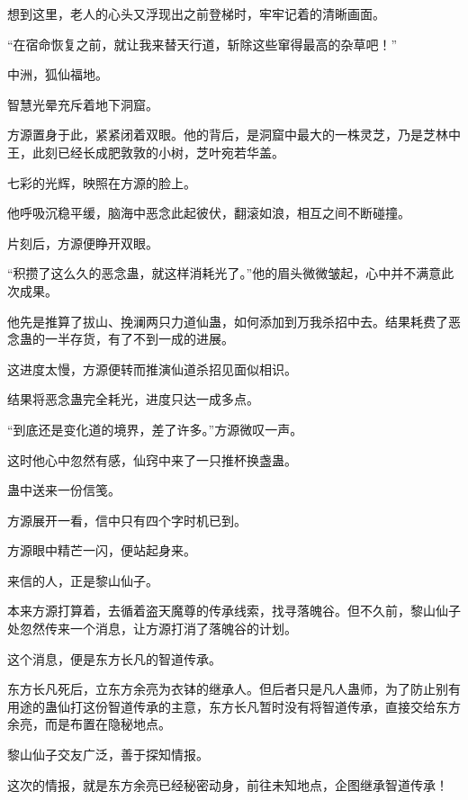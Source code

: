 \begin{this_body}
想到这里，老人的心头又浮现出之前登梯时，牢牢记着的清晰画面。

“在宿命恢复之前，就让我来替天行道，斩除这些窜得最高的杂草吧！”

中洲，狐仙福地。

智慧光晕充斥着地下洞窟。

方源置身于此，紧紧闭着双眼。他的背后，是洞窟中最大的一株灵芝，乃是芝林中王，此刻已经长成肥敦敦的小树，芝叶宛若华盖。

七彩的光辉，映照在方源的脸上。

他呼吸沉稳平缓，脑海中恶念此起彼伏，翻滚如浪，相互之间不断碰撞。

片刻后，方源便睁开双眼。

“积攒了这么久的恶念蛊，就这样消耗光了。”他的眉头微微皱起，心中并不满意此次成果。

他先是推算了拔山、挽澜两只力道仙蛊，如何添加到万我杀招中去。结果耗费了恶念蛊的一半存货，有了不到一成的进展。

这进度太慢，方源便转而推演仙道杀招见面似相识。

结果将恶念蛊完全耗光，进度只达一成多点。

“到底还是变化道的境界，差了许多。”方源微叹一声。

这时他心中忽然有感，仙窍中来了一只推杯换盏蛊。

蛊中送来一份信笺。

方源展开一看，信中只有四个字时机已到。

方源眼中精芒一闪，便站起身来。

来信的人，正是黎山仙子。

本来方源打算着，去循着盗天魔尊的传承线索，找寻落魄谷。但不久前，黎山仙子处忽然传来一个消息，让方源打消了落魄谷的计划。

这个消息，便是东方长凡的智道传承。

东方长凡死后，立东方余亮为衣钵的继承人。但后者只是凡人蛊师，为了防止别有用途的蛊仙打这份智道传承的主意，东方长凡暂时没有将智道传承，直接交给东方余亮，而是布置在隐秘地点。

黎山仙子交友广泛，善于探知情报。

这次的情报，就是东方余亮已经秘密动身，前往未知地点，企图继承智道传承！

\end{this_body}

